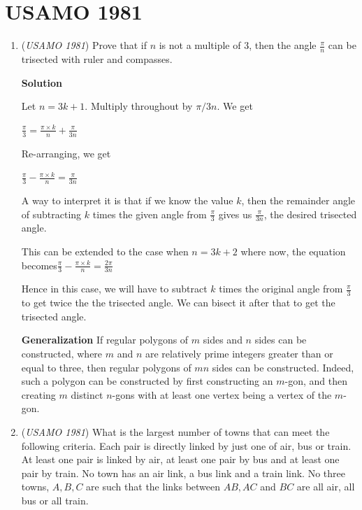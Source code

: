 \section{USAMO 1981}
        \begin{enumerate}
        	\item (\textit{USAMO 1981}) Prove that if $n$ is not a multiple of $3$, then the angle $\frac{\pi}{n}$ can be trisected with ruler and compasses. 


 



\textbf{Solution}

Let $n=3k+1$.  Multiply throughout by $\pi/3n$. We get 

 $\frac{\pi}{3} = \frac{\pi \times k}{n} + \frac{\pi}{3n}$

 Re-arranging, we get

 $\frac{\pi}{3} - \frac{\pi \times k}{n} = \frac{\pi}{3n}$

 A way to interpret it is that if we know the value $k$, then the remainder angle of subtracting $k$ times the given angle from $\frac{\pi}{3}$ gives us $\frac{\pi}{3n}$, the desired trisected angle.

 This can be extended to the case when $n=3k+2$ where now, the equation becomes$\frac{\pi}{3} - \frac{\pi \times k}{n} = \frac{2\pi}{3n}$

 Hence in this case, we will have to subtract $k$ times the original angle from $\frac{\pi}{3}$ to get twice the the trisected angle. We can bisect it after that to get the trisected angle.

 \textbf{Generalization} If regular polygons of $m$ sides and $n$ sides can be constructed, where $m$ and $n$ are relatively prime integers greater than or equal to three, then regular polygons of $mn$ sides can be constructed. Indeed, such a polygon can be constructed by first constructing an $m$-gon, and then creating $m$ distinct $n$-gons with at least one vertex being a vertex of the $m$-gon.

 


	\item (\textit{USAMO 1981}) What is the largest number of towns that can meet the following criteria. Each pair is directly linked by just one of air, bus or train. At least one pair is linked by air, at least one pair by bus and at least one pair by train. No town has an air link, a bus link and a train link. No three towns, $A, B, C$ are such that the links between $AB, AC$ and $BC$ are all air, all bus or all train.



\end{enumerate}
